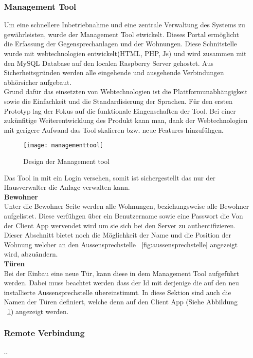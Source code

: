 \subsubsection{Management Tool}
\label{kap:managementtool}
Um eine schnellere Inbetriebnahme und eine zentrale Verwaltung des Systems zu gewährleisten, wurde der Management Tool etwickelt. Dieses Portal ermöglicht die Erfassung der Gegensprechanlagen und der Wohnungen.
Diese Schnitstelle wurde mit webtechnologien entwickelt(HTML, PHP, Js) und wird zusammen mit den MySQL Database auf den localen Raspberry Server gehostet. Aus Sicherheitsgründen werden alle eingehende und ausgehende Verbindungen abhörsicher aufgebaut.
\\
Grund dafür das einsetzten von Webtechnologien ist die Plattformunabhängigkeit sowie die Einfachkeit und die Standardisierung der Sprachen. Für den ersten Prototyp lag der Fokus auf die funktionale Eingenschaften der Tool. Bei einer zukünfitige Weiterentwicklung des Produkt kann man, dank der Webtechnologien mit gerigere Aufwand das Tool skalieren bzw. neue Features hinzufühgen.  

\begin{figure}[htb!]
	\begin{center}
		\texttt{[image: managementtool]}
		\caption[Design der Management tool]{Design der Management tool}
		\label{fig:managementtool}
	\end{center}
\end{figure}

Das Tool in mit ein Login versehen, somit ist sichergestellt das nur der Hausverwalter die Anlage verwalten kann. 
\\
\textbf{Bewohner} 
\\
Unter die Bewohner Seite werden alle Wohnungen, beziehungsweise alle Bewohner aufgelistet. Diese verfühgen über ein Benutzername sowie eine Passwort die Von der Client App wervendet wird um sie sich bei den Server zu authentifizieren. Dieser Abschnitt bietet noch die Möglichkeit der Name und die Position der Wohnung welcher an den Aussensprechstelle ~\ref{fig:aussensprechstelle} angezeigt wird, abzuändern.
\\
\textbf{Türen} 
\\
Bei der Einbau eine neue Tür, kann diese in dem Management Tool aufgeführt werden. Dabei muss beachtet werden dass der Id mit derjenige die auf den neu installierte Aussensprechstelle übereinstimmt. In diese Sektion sind auch die Namen der Türen definiert, welche denn auf den Client App (Siehe Abbildung ~\ref{fig:managementtool})  angezeigt werden. 


\subsubsection{Remote Verbindung}
\label{kap:remote}
..



\newpage